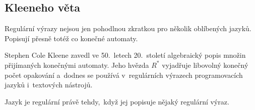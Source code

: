 
\subsection{Kleeneho věta}

Regulární výrazy nejsou jen pohodlnou zkratkou pro několik oblíbených jazyků. Popisují přesně totéž co konečné automaty.

\begin{remark}
    Stephen Cole Kleene zavedl ve 50.~letech 20.~století algebraický popis množin přijímaných konečnými automaty. Jeho hvězda $R^*$ vyjadřuje libovolný konečný počet opakování a~dodnes se používá v~regulárních výrazech programovacích jazyků i~textových nástrojů.
\end{remark}

\begin{theorem}\label{thm:kleene}
    Jazyk je regulární právě tehdy,~když jej popisuje nějaký regulární výraz.
\end{theorem}

